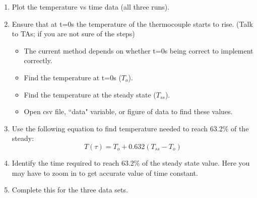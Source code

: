 \documentclass{article} %
\begin{document}
\begin{enumerate}
    \item Plot the temperature vs time data (all three runs). 
    \item Ensure that at t=0s the temperature of the thermocouple starts to rise. (Talk to TAs; if you are not sure of the steps)
    \begin{itemize}
        \item The current method depends on whether t=0s being correct to implement correctly.
        \item Find the temperature at t=0s ($T_o$).
        \item Find the temperature at the steady state ($T_{ss}$).
        \item Open csv file, ``data" variable, or figure of data to find these values.
    \end{itemize}
    \item Use the following equation to find temperature needed to reach 63.2\% of the steady:
    \begin{equation}
        T(\tau)=T_o+0.632(T_{ss}-T_o)
    \end{equation}
    \item Identify the time required to reach 63.2\% of the steady state value. Here you may have to zoom in to get accurate value of time constant.
    \item Complete this for the three data sets.
\end{enumerate}
\end{document}

